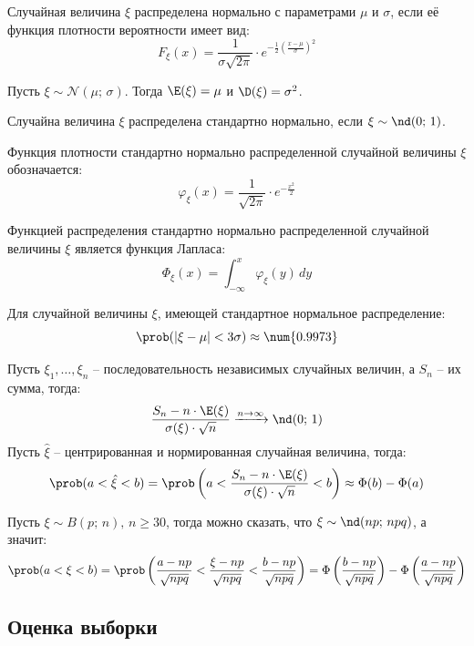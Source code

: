 \documentclass[12pt]{article}
\begin{document}
\begin{definition}
    Случайная величина $\xi$ распределена нормально с параметрами $\mu$ и $\sigma$, если её функция плотности вероятности имеет вид:
    $$F_\xi(x)=\frac{1}{\sigma\sqrt{2\pi}}\cdot e^{-\frac{1}{2}\left(\frac{x-\mu}{\sigma}\right)^2}$$
\end{definition}
\begin{theorem}
    Пусть $\xi\sim\mathcal{N}(\mu;\,\sigma)$. Тогда $\E(\xi)=\mu$ и $\D(\xi)=\sigma^2$.
\end{theorem}
\begin{definition}
    Случайна величина $\xi$ распределена стандартно нормально, если $\xi\sim\nd(0;\,1)$.
\end{definition}
\begin{definition}
    Функция плотности стандартно нормально распределенной случайной величины $\xi$ обозначается:
    $$\varphi_\xi(x)=\frac{1}{\sqrt{2\pi}}\cdot e^{-\frac{x^2}{2}}$$
\end{definition}
\begin{theorem}
    Функцией распределения стандартно нормально распределенной случайной величины $\xi$ является функция Лапласа:
    $$\Phi_\xi(x)=\int_{-\infty}^{x}\varphi_\xi(y)\, dy $$
\end{theorem}
\begin{theorem}
    Для случайной величины $\xi$, имеющей стандартное нормальное распределение:
    $$\prob(|\xi-\mu|<3\sigma)\approx\num{0.9973}$$
\end{theorem}
\begin{theorem}
    Пусть $\xi_1,\ldots,\xi_n$ – последовательность независимых случайных величин, а $S_n$ – их сумма, тогда:
    $$\frac{S_n-n\cdot \E(\xi)}{\sigma(\xi)\cdot\sqrt{n}}\xrightarrow{n\to\infty}\nd(0;\,1)$$
    Пусть $\hat{\xi}$ – центрированная и нормированная случайная величина, тогда: 
    $$\prob(a<\hat{\xi}<b)=\prob\left(a<\frac{S_n-n\cdot \E(\xi)}{\sigma(\xi)\cdot\sqrt{n}}<b\right)\approx\Phi(b)-\Phi(a)$$
\end{theorem}
\begin{theorem}
    Пусть $\xi\sim B(p;\,n),\,n\geq30$, тогда можно сказать, что $\xi\sim\nd(np;\,npq)$, а значит:
    $$\prob(a<\xi<b)=\prob\left(\frac{a-np}{\sqrt{npq}}<\frac{\xi-np}{\sqrt{npq}}<\frac{b-np}{\sqrt{npq}}\right)=\Phi\left(\frac{b-np}{\sqrt{npq}}\right)-\Phi\left(\frac{a-np}{\sqrt{npq}}\right)$$
\end{theorem}

\subsection{Оценка выборки}
\end{document}
